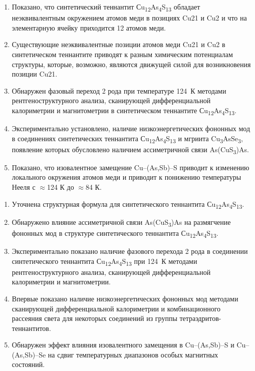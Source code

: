 \begin{enumerate}
\item Показано, что синтетический теннантит Сu\textsubscript{12}As\textsubscript{4}S\textsubscript{13} обладает неэквивалентным  окружением атомов меди в позициях Cu21 и Cu2 и что на элементарную ячейку приходится 12 атомов меди.
\item Существующие неэквивалентные позиции атомов меди Cu21 и Cu2 в синтетическом теннантите приводят к разным химическим потенциалам структуры, которые, возможно, являются движущей силой для возникновения позиции Cu21.
\item Обнаружен фазовый переход 2 рода при температуре 124~К методами рентгеноструктурного анализа, сканирующей дифференциальной калориметрии и магнитометрии  в синтетическом теннантите Сu\textsubscript{12}As\textsubscript{4}S\textsubscript{13}.
\item Экспериментально установлено, наличие низкоэнергетических фононных мод в соединениях синтетических теннантита Сu\textsubscript{12}As\textsubscript{4}S\textsubscript{13} и мгриита Cu\textsubscript{3}AsSe\textsubscript{3}, появление которых обусловлено наличием ассиметричной связи As(CuS\textsubscript{3})As.
\item Показано, что изовалентное замещение Cu--(As,Sb)--S приводит к изменению локального окружения атомов меди и приводит к понижению температуры Нееля с $\approx$124 К до $\approx$84 К.

\end{enumerate}

\novelty
\begin{enumerate}
\item Уточнена структурная формула для синтетического теннантита Сu\textsubscript{12}As\textsubscript{4}S\textsubscript{13}.
\item  Обнаружено влияние ассиметричной связи As(CuS\textsubscript{3})As на размягчение фононных мод в структуре синтетического теннантита Сu\textsubscript{12}As\textsubscript{4}S\textsubscript{13}.
\item Экспериментально показано наличие фазового перехода 2 рода в соединении  синтетического теннантита Сu\textsubscript{12}As\textsubscript{4}S\textsubscript{13} при 124~К методами рентгеноструктурного анализа, сканирующей дифференциальной калориметрии и магнитометрии.
\item Впервые показано наличие низкоэнергетических фононных мод методами сканирующей дифференциальной калориметрии и комбинационного рассеяния света для некоторых соединений из группы тетраэдритов-теннантитов.
\item Обнаружен эффект влияния изовалентного замещения в Cu--(As,Sb)--S и  Cu--(As,Sb)--Se на сдвиг температурных диапазонов  особых магнитных состояний.
\end{enumerate}

